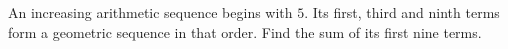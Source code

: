 An increasing arithmetic sequence begins with $5$. Its first, third and ninth terms form a geometric sequence in that order. Find the sum of its first nine terms.
